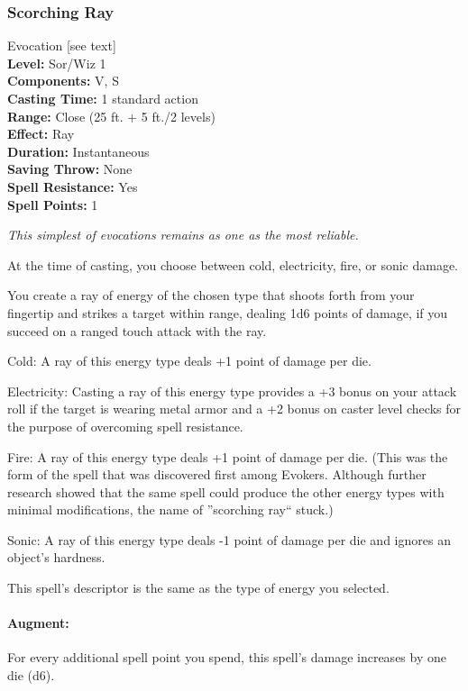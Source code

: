 \subsubsection{Scorching Ray}
\label{Spell:ScorchingRay}
Evocation [see text]
\\ \textbf{Level:} Sor/Wiz 1
\\ \textbf{Components:} V, S
\\ \textbf{Casting Time:} 1 standard action
\\ \textbf{Range:} Close (25 ft. + 5 ft./2 levels)
\\ \textbf{Effect:} Ray
\\ \textbf{Duration:} Instantaneous
\\ \textbf{Saving Throw:} None
\\ \textbf{Spell Resistance:} Yes
\\ \textbf{Spell Points:} 1

\emph{This simplest of evocations remains as one as the most reliable.}

At the time of casting, you choose between cold, electricity, fire, or sonic damage. 

You create a ray of energy of the chosen type that shoots forth from your fingertip and strikes a target within range, 
dealing 1d6 points of damage, if you succeed on a ranged touch attack with the ray.

\begin{list}{}{\leftmargin=1em}
 \item Cold: A ray of this energy type deals +1 point of damage per die.
 \item Electricity: Casting a ray of this energy type provides a +3 bonus on your attack roll if the target is wearing metal armor 
 and a +2 bonus on caster level checks for the purpose of overcoming spell resistance.
 \item Fire: A ray of this energy type deals +1 point of damage per die. (This was the form of the spell that was discovered first among Evokers.
 Although further research showed that the same spell could produce the other energy types with minimal modifications, the name of ''scorching ray`` stuck.)
 \item Sonic: A ray of this energy type deals -1 point of damage per die and ignores an object's hardness.
\end{list}

This spell's descriptor is the same as the type of energy you selected. 

\paragraph{Augment:} For every additional spell point you spend, this spell's damage increases by one die (d6).
